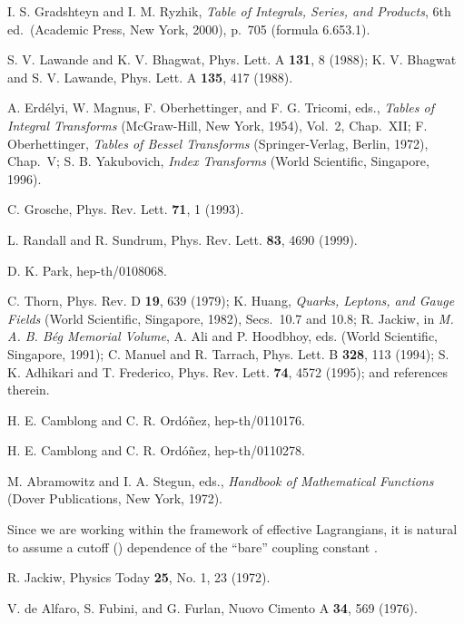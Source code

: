 \documentclass[a4paper,preprint,draft,showpacs,amsmath,amsfonts,amssymb,aps,prd]{revtex4}%
\begin{document}
\begin{thebibliography}{99}
I. S.  Gradshteyn and I. M. Ryzhik,
{\em Table of Integrals, Series, and Products\/},  6th ed.\
(Academic Press, New York, 2000), 
p.\ 705  (formula 6.653.1).

S. V. Lawande and K. V. Bhagwat,
Phys. Lett. A {\bf 131}, 8 (1988);
K. V. Bhagwat and S. V. Lawande,
Phys. Lett. A {\bf 135}, 417 (1988).

A. Erd\'{e}lyi, W. Magnus, F. Oberhettinger, and F. G.
 Tricomi, eds.,
{\em Tables of Integral Transforms\/}
(McGraw-Hill, New York, 1954), Vol.\ 2, Chap.\ XII;
F. Oberhettinger,
{\em Tables of Bessel Transforms\/}
(Springer-Verlag, Berlin, 1972),
Chap.\ V;
S. B. Yakubovich,
{\em Index Transforms\/}
(World Scientific, Singapore, 1996).

C. Grosche, Phys. Rev. Lett. {\bf 71}, 1 (1993).

L. Randall and R. Sundrum, 
 Phys. Rev. Lett. {\bf 83},  4690 (1999).

D. K. 
Park, hep-th/0108068.

C. Thorn,
Phys. Rev. D {\bf 19}, 639 (1979);
K. Huang,
{\em Quarks, Leptons, and Gauge Fields\/}
(World Scientific, Singapore, 1982), Secs.\ 10.7 and 10.8;
R. Jackiw,
in {\em M. A. B. B\'{e}g Memorial Volume\/},
A. Ali and P. Hoodbhoy, eds. (World Scientific, Singapore, 1991);
C. Manuel and R. Tarrach, 
  Phys. Lett. B {\bf 328}, 113 (1994); %
S. K.  Adhikari and T. Frederico, 
 Phys. Rev. Lett. {\bf 74}, 4572  (1995); 
and references therein.

H. E. Camblong and C. R. Ord\'{o}\~{n}ez,
hep-th/0110176.

H. E. Camblong and C. R. Ord\'{o}\~{n}ez,
hep-th/0110278.

M. Abramowitz and I. A. Stegun, eds.,
{\em Handbook of Mathematical Functions\/}
(Dover Publications, New York, 1972).

Since we are working within the framework of effective Lagrangians, it
is natural to assume a cutoff (\myHighlight{$a$}\coordHE{}) dependence of the ``bare'' 
coupling constant \myHighlight{$\lambda$}\coordHE{}.

R. Jackiw, Physics Today {\bf 25}, No. 1, 23 (1972).

V. de Alfaro, S. Fubini, and G. Furlan, Nuovo Cimento A {\bf 34},
569 (1976).


\end{thebibliography}
\end{document}
